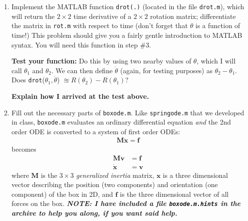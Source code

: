 \documentclass{article}
\providecommand{\vect}[1]{\bm#1}
\providecommand{\mat}[1]{\mathbf#1}
\begin{document}
\begin{enumerate}
\item Implement the MATLAB function \texttt{drot(.)} (located in the file \texttt{drot.m}), which will return the $2 \times 2$ time derivative of a $2 \times 2$ rotation matrix; differentiate the matrix in \texttt{rot.m} with respect to time 
(don't forget that $\theta$ is a function of time!) This problem should give you a fairly gentle introduction to MATLAB syntax. You will need this function
in step \#3.

\textbf{Test your function:}
Do this by using two nearby values of $\theta$, which I will call $\theta_1$ and $\theta_2$. We can then define $\dot{\theta}$ (again, for testing purposes) as
$\theta_2 - \theta_1$. Does \texttt{drot}($\theta_1, \dot{\theta}$) $\approxeq R(\theta_2) - R(\theta_1)$?

\textbf{Explain how I arrived at the test above.} 

\item Fill out the necessary parts of \texttt{boxode.m}. Like \texttt{springode.m} that we developed in class, \texttt{boxode.m} evaluates an ordinary differential equation \emph{and} the 2nd order ODE is converted to a system of first order ODEs:
\begin{align}
\mat{M}\ddot{\vect{x}} = \vect{f}
\end{align} 
becomes
\begin{align}
\mat{M}\dot{\vect{v}} & = \vect{f} \\
\dot{\vect{x}} & = \vect{v}
\end{align} 
where $\mat{M}$ is the $3 \times 3$ \emph{generalized inertia} matrix, $\vect{x}$ is a three dimensional vector describing the position (two components) and orientation (one component) of the box in 2D, and $\vect{f}$ is the three dimensional vector of all forces on the box. \textbf{\emph{NOTE: I have included a file \texttt{boxode.m.hints} in the archive to help you along, if you want said help.}}


\end{enumerate}
\end{document}
